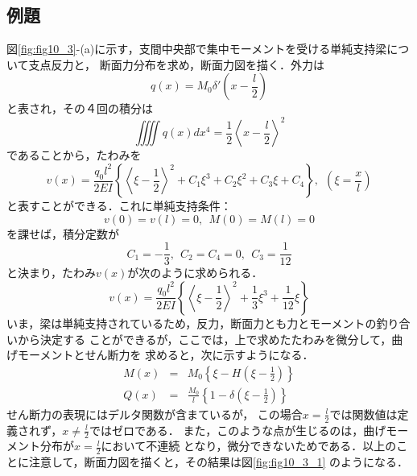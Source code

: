 \documentclass[10pt,a4j]{jarticle}
\begin{document}
\subsection{例題}
図\ref{fig:fig10_3}-(a)に示す，支間中央部で集中モーメントを受ける単純支持梁について支点反力と，
断面力分布を求め，断面力図を描く．外力は
\begin{equation}
	q(x)=M_0\delta'\left(x-\frac{l}{2}\right)
\end{equation}
と表され，その４回の積分は
\begin{equation}
	\iiiint q(x)dx^4 =\frac{1}{2}\left< x-\frac{l}{2}\right>^2
\end{equation}
であることから，たわみを
\begin{equation}
	v(x)=\frac{q_0l^2}{2EI}\left\{ \left< \xi -\frac{1}{2} \right>^2+C_1\xi^3 +C_2\xi^2+C_3\xi+C_4\right\}, \ \ 
	\left(\xi=\frac{x}{l}\right)
\end{equation}
と表すことができる．これに単純支持条件：
\begin{equation}
	v(0)=v(l)=0, \ \ M(0)=M(l)=0
\end{equation}
を課せば，積分定数が
\begin{equation}
	C_1=-\frac{1}{3}, \ \ C_2=C_4=0, \ \ C_3=\frac{1}{12}
\end{equation}
と決まり，たわみ$v(x)$が次のように求められる．
\begin{equation}
	v(x)=\frac{q_0l^2}{2EI}\left\{ \left< \xi -\frac{1}{2} \right>^2+\frac{1}{3}\xi^3 +\frac{1}{12}\xi \right\}
\end{equation}
いま，梁は単純支持されているため，反力，断面力とも力とモーメントの釣り合いから決定する
ことができるが，ここでは，上で求めたたわみを微分して，曲げモーメントとせん断力を
求めると，次に示すようになる．
\begin{eqnarray}
	M(x) &= & 
		M_0\left\{ \xi -H \left(\xi-\frac{1}{2}\right) \right\} \\
	Q(x) &= & 
		\frac{M_0}{l}\left\{1 -\delta\left(\xi-\frac{1}{2}\right)  \right\}
\end{eqnarray}
せん断力の表現にはデルタ関数が含まているが，
この場合$x=\frac{l}{2}$では関数値は定義されず，$x\neq \frac{l}{2}$ではゼロである．
また，このような点が生じるのは，曲げモーメント分布が$x=\frac{l}{2}$において不連続
となり，微分できないためである．以上のことに注意して，断面力図を描くと，その結果は図\ref{fig:fig10_3_1}
のようになる．
\end{document}
